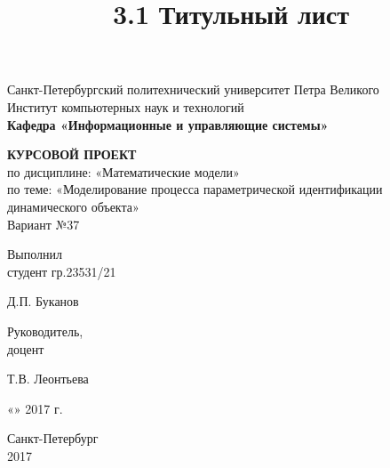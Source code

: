 \documentclass[a4paper, 12pt]{article}
\title{3.1 Титульный лист}
\begin{document}
\thispagestyle{empty}

\begin{center}
    Санкт-Петербургский политехнический университет Петра Великого\\
    Институт компьютерных наук и технологий\\
    \bfseries{Кафедра «Информационные и управляющие системы»}
\end{center}

\vspace{20ex}

\begin{center}
    {
    \LARGE \textbf{КУРСОВОЙ ПРОЕКТ} \\[3ex]
    по дисциплине: «Математические модели» \\
    по теме: «Моделирование процесса параметрической идентификации динамического объекта» \\[3ex]
    Вариант №37
    }
\end{center}

\vspace{40ex}

\noindent Выполнил\\
студент гр.23531/21\hfill
\begin{minipage}{0.7\textwidth}
    \hfill \uline{\hspace{3cm}} \hspace{1.1cm} Д.П. Буканов
\end{minipage}

\vspace{3ex}

\noindent Руководитель,\\
доцент\hfill
\begin{minipage}{0.7\textwidth}
    \hfill \uline{\hspace{3cm}} \hspace{0.5cm} Т.В. Леонтьева
\end{minipage}

\vspace{3ex}

\hfill \begin{minipage}{0.6\textwidth} \hfill «\uline{\hspace{1cm}}»\uline{\hspace{3cm}} 2017 г.\end{minipage}

\vfill

\begin{center}
    Санкт-Петербург\\
    2017
\end{center}
\end{document}
